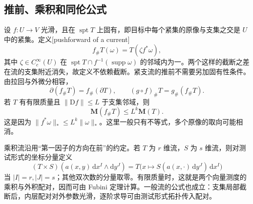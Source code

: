 \subsection{推前、乘积和同伦公式}
\label{g3:subsec:2201:03}
设 \(f:U\to V\) 光滑，且在 \(\operatorname{spt}T\) 上固有，即目标中每个紧集的原像与支集之交是 \(U\) 中的紧集。定义[pushforward of a current]
\[
	f_\#T(\omega)=T(\zeta f^*\omega),
\]
其中 \(\zeta\in C_c^\infty(U)\) 在 \(\operatorname{spt}T\cap f^{-1}(\operatorname{supp}\omega)\) 的邻域内为一。两个这样的截断之差在流的支集附近消失，故定义不依赖截断。紧支流的推前不需要另加固有性条件。由拉回与外微分相容，
\begin{equation}\label{g3:eq:current-pushforward-boundary}
	\partial(f_\#T)=f_\#(\partial T),\qquad
	(g\circ f)_\#T=g_\#(f_\#T).
\end{equation}
若 \(T\) 有有限质量且 \(\|\mathrm Df\|\le L\) 于支集邻域，则
\begin{equation}\label{g3:eq:current-pushforward-mass}
	\mathbf M(f_\#T)\le L^k\mathbf M(T).
\end{equation}
这是因为 \(\|f^*\omega\|_*\le L^k\|\omega\|_*\)。这里一般只有不等式，多个原像的取向可能相消。

乘积流沿用“第一因子的方向在前”的约定。若 \(T\) 为 \(r\) 维流，\(S\) 为 \(s\) 维流，则对测试形式的坐标分量定义
\[
	(T\times S)(a(x,y)\,\mathrm dx^I\wedge\mathrm dy^J)
	=T\bigl(x\mapsto S(a(x,\cdot)\,\mathrm dy^J)\,\mathrm dx^I\bigr)
\]
当 \(|I|=r,|J|=s\)；其他双次数的分量取零。有限质量时，这就是两个向量测度的乘积与外积配对，因而可由 Fubini 定理计算。一般流的公式也成立：支集局部截断后，内层配对对外参数光滑，逐阶求导可由测试形式拓扑传入配对。

